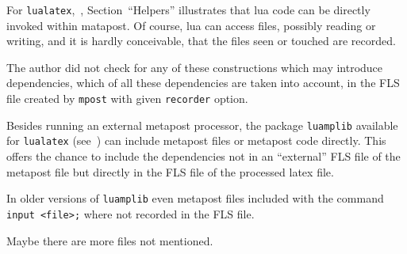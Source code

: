 \documentclass[a4paper]{article}
\begin{document}
For \texttt{lualatex},~\cite{LuaInMp}, 
Section~``Helpers'' illustrates that lua code can be directly invoked within matapost. 
Of course, lua can access files, possibly reading or writing, and it is hardly conceivable, 
that the files seen or touched are recorded. 

The author did not check for any of these constructions which may introduce dependencies, 
which of all these dependencies are taken into account, 
in the FLS file created by \texttt{mpost} with given \texttt{recorder} option. 

Besides running an external metapost processor, 
the package \texttt{luamplib} available for \texttt{lualatex} (see~\cite{LuaMpLib})
can include metapost files or metapost code directly. 
This offers the chance 
to include the dependencies not in an ``external'' FLS file of the metapost file
but directly in the FLS file of the processed latex file. 

In older versions of \texttt{luamplib} 
even metapost files included with the command \texttt{input <file>;} 
where not recorded in the FLS file. 

Maybe there are more files not mentioned. 




{}%
\end{document}
